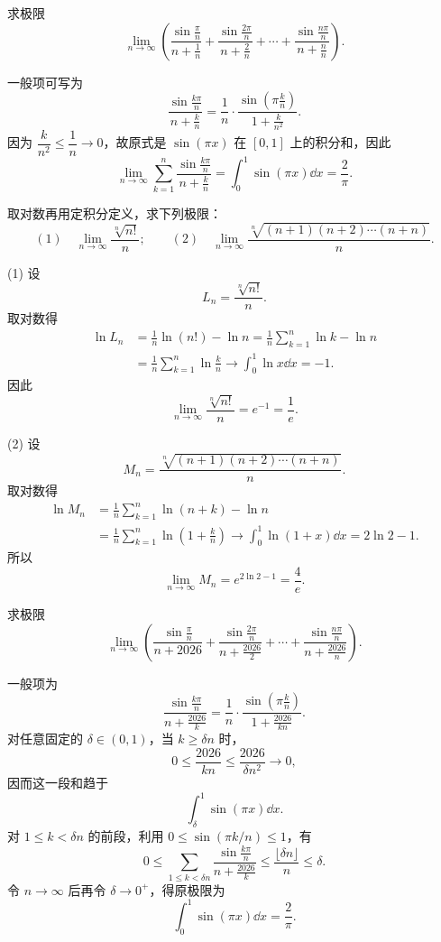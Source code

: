 \begin{problem}
	求极限
	\[
	\lim_{n\to\infty}\left(
	\frac{\sin\frac{\pi}{n}}{n+\frac1n}
	+\frac{\sin\frac{2\pi}{n}}{n+\frac2n}
	+\cdots+
	\frac{\sin\frac{n\pi}{n}}{n+\frac nn}
	\right).
	\]
\end{problem}

\begin{solution}
	一般项可写为
	\[
	\frac{\sin\frac{k\pi}{n}}{n+\frac{k}{n} }
	=\frac1n\cdot\frac{\sin\left(\pi\frac{k}{n}\right)}{1+\frac{k}{n^2}}.
	\]
	因为 $\dfrac{k}{n^2}\leq \dfrac1n\to0$，故原式是 $\sin(\pi x)$ 在 $[0,1]$ 上的积分和，因此
	\[
	\lim_{n\to\infty}\sum_{k=1}^n\frac{\sin\frac{k\pi}{n}}{n+\frac{k}{n} }
	=\int_0^1\sin(\pi x)\dd x=\frac2\pi.
	\]
\end{solution}

\begin{problem}
	取对数再用定积分定义，求下列极限：
	\[
	(1)\quad \lim_{n\to\infty}\frac{\sqrt[n]{n!}}{n};
	\qquad
	(2)\quad \lim_{n\to\infty}\frac{\sqrt[n]{(n+1)(n+2)\cdots(n+n)}}{n}.
	\]
\end{problem}

\begin{solution}
	(1) 设
	\[
	L_n=\frac{\sqrt[n]{n!}}{n}.
	\]
	取对数得
	\[
	\begin{aligned}
		\ln L_n
		&=\frac1n\ln(n!)-\ln n
		=\frac1n\sum_{k=1}^n\ln k-\ln n\\
		&=\frac1n\sum_{k=1}^n\ln\frac{k}{n}
		\to \int_0^1\ln x\dd x=-1.
	\end{aligned}
	\]
	因此
	\[
	\lim_{n\to\infty}\frac{\sqrt[n]{n!}}{n}=e^{-1}=\frac1e.
	\]
	
	(2) 设
	\[
	M_n=\frac{\sqrt[n]{(n+1)(n+2)\cdots(n+n)}}{n}.
	\]
	取对数得
	\[
	\begin{aligned}
		\ln M_n
		&=\frac1n\sum_{k=1}^n\ln(n+k)-\ln n\\
		&=\frac1n\sum_{k=1}^n\ln\left(1+\frac{k}{n}\right)
		\to \int_0^1\ln(1+x)\dd x=2\ln2-1.
	\end{aligned}
	\]
	所以
	\[
	\lim_{n\to\infty}M_n=e^{2\ln2-1}=\frac4e.
	\]
\end{solution}



\begin{problem}
	求极限
	\[
	\lim_{n\to\infty}\left(
	\frac{\sin\frac{\pi}{n}}{n+2026}
	+\frac{\sin\frac{2\pi}{n}}{n+\frac{2026}{2}}
	+\cdots+
	\frac{\sin\frac{n\pi}{n}}{n+\frac{2026}{n}}
	\right).
	\]
\end{problem}

\begin{solution}
	一般项为
	\[
	\frac{\sin\frac{k\pi}{n}}{n+\frac{2026}{k}}
	=\frac1n\cdot \frac{\sin\left(\pi\frac{k}{n}\right)}{1+\frac{2026}{kn}}.
	\]
	对任意固定的 $\delta\in(0,1)$，当 $k\geq \delta n$ 时，
	\[
	0\leq \frac{2026}{kn}\leq \frac{2026}{\delta n^2}\to0,
	\]
	因而这一段和趋于
	\[
	\int_\delta^1\sin(\pi x)\dd x.
	\]
	对 $1\leq k<\delta n$ 的前段，利用 $0\leq \sin(\pi k/n)\leq 1$，有
	\[
	0\leq \sum_{1\leq k<\delta n}\frac{\sin\frac{k\pi}{n}}{n+\frac{2026}{k}}
	\leq \frac{\lfloor \delta n\rfloor}{n}\leq \delta.
	\]
	令 $n\to\infty$ 后再令 $\delta\to0^+$，得原极限为
	\[
	\int_0^1\sin(\pi x)\dd x=\frac2\pi.
	\]
\end{solution}

